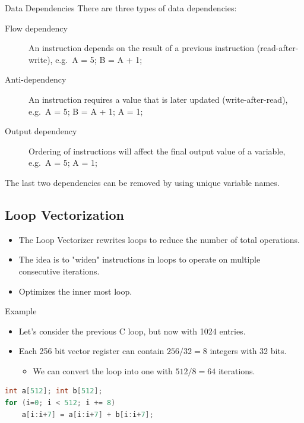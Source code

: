 \documentclass[]{beamer}
\begin{document}
\begin{frame}{Data Dependencies}
There are three types of data dependencies:
\begin{description}
  \item[Flow dependency]  An instruction depends on the result of a previous instruction (read-after-write), 
                          e.g.\ A = 5; B = A + 1;
  \item[Anti-dependency]  An instruction requires a value that is later updated (write-after-read),
                          e.g.\ A = 5; B = A + 1; A = 1;
  \item[Output dependency] Ordering of instructions will affect the final output value of a variable,
                           e.g.\ A = 5; A = 1;
\end{description}
The last two dependencies can be removed by using unique variable names.
\end{frame}

\subsection{Loop Vectorization}

\begin{frame}{}
\begin{itemize}
  \item The Loop Vectorizer rewrites loops to reduce the number of total operations.
  \item The idea is to "widen" instructions in loops to operate on multiple consecutive iterations.
  \item Optimizes the inner most loop.
\end{itemize}
\end{frame}



\begin{frame}[fragile]{Example}

\begin{itemize}
  \item Let's consider the previous C loop, but now with 1024 entries.
  \item Each 256 bit vector register can contain $256/32 = 8$ integers with 32 bits.
  \begin{itemize}
    \item We can convert the loop into one with $512 / 8 = 64$ iterations.
  \end{itemize}
\end{itemize}

\begin{lstlisting}[language=C]
int a[512]; int b[512];
for (i=0; i < 512; i += 8)
    a[i:i+7] = a[i:i+7] + b[i:i+7];
\end{lstlisting}
\end{frame}
\end{document}
